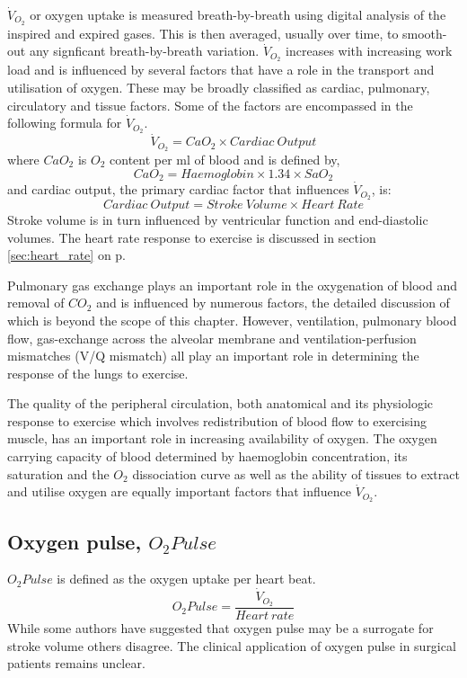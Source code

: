 $\dot{V}_{O_2}$ or oxygen uptake is measured breath-by-breath using digital analysis of the inspired and expired gases. 
This is then averaged, usually over time, to smooth-out any signficant breath-by-breath variation. $\dot{V}_{O_2}$ increases with increasing work load and is influenced by several factors that have a role in the transport and utilisation of oxygen. 
These may be broadly classified as cardiac, pulmonary, circulatory and tissue factors. 
Some of the factors are encompassed in the following formula for $\dot{V}_{O_2}$.
\begin{equation} \label{eq:oxygen_consumption}
	\dot{V}_{O_2} = CaO_2 \times Cardiac\ Output
\end{equation}
where $CaO_2$ is $O_2$ content per ml of blood and is defined by,
\begin{equation} \label{eq:CaO2}
	CaO_2 = Haemoglobin \times 1.34 \times SaO_2
\end{equation}
and
cardiac output, the primary cardiac factor that influences $\dot{V}_{O_2}$, is:
\begin{equation} \label{eq:CO=SVxHR}
	Cardiac\ Output = Stroke\ Volume \times Heart\ Rate
\end{equation}
Stroke volume is in turn influenced by ventricular function and end-diastolic volumes. 
The heart rate response to exercise is discussed in section \ref{sec:heart_rate} on p\pageref{sec:heart_rate}.

Pulmonary gas exchange plays an important role in the oxygenation of blood and removal of $CO_2$ and is influenced by numerous factors, the detailed discussion of which is beyond the scope of this chapter. 
However, ventilation, pulmonary blood flow, gas-exchange across the alveolar membrane and ventilation-perfusion mismatches (V/Q mismatch) all play an important role in determining the response of the lungs to exercise.

The quality of the peripheral circulation, both anatomical and its physiologic response to exercise which involves redistribution of blood flow to exercising muscle, has an important role in increasing availability of oxygen. 
The oxygen carrying capacity of blood determined by haemoglobin concentration, its saturation and the $O_2$ dissociation curve as well as the ability of tissues to extract and utilise oxygen are equally important factors that influence $\dot{V}_{O_2}$.

\subsection[Oxygen pulse]{Oxygen pulse, $O_2Pulse$}
$O_2Pulse$ is defined as the oxygen uptake per heart beat.
\begin{equation} \label{eq:oxygen_pulse}
	O_2Pulse = \frac{\dot{V}_{O_2}}{Heart\ rate}
\end{equation}
While some authors have suggested that oxygen pulse may be a surrogate for stroke volume others disagree. 
The clinical application of oxygen pulse in surgical patients remains unclear.

